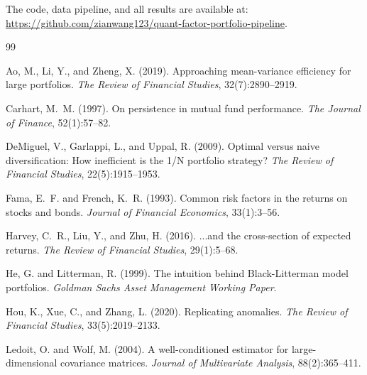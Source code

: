 \documentclass[12pt,a4paper]{article}
\begin{document}
The code, data pipeline, and all results are available at:\\ \url{https://github.com/zianwang123/quant-factor-portfolio-pipeline}.

\begin{thebibliography}{99}

Ao, M., Li, Y., and Zheng, X. (2019).
\newblock Approaching mean-variance efficiency for large portfolios.
\newblock \textit{The Review of Financial Studies}, 32(7):2890--2919.

Carhart, M.~M. (1997).
\newblock On persistence in mutual fund performance.
\newblock \textit{The Journal of Finance}, 52(1):57--82.

DeMiguel, V., Garlappi, L., and Uppal, R. (2009).
\newblock Optimal versus naive diversification: How inefficient is the 1/N portfolio strategy?
\newblock \textit{The Review of Financial Studies}, 22(5):1915--1953.

Fama, E.~F. and French, K.~R. (1993).
\newblock Common risk factors in the returns on stocks and bonds.
\newblock \textit{Journal of Financial Economics}, 33(1):3--56.

Harvey, C.~R., Liu, Y., and Zhu, H. (2016).
\newblock ...and the cross-section of expected returns.
\newblock \textit{The Review of Financial Studies}, 29(1):5--68.

He, G. and Litterman, R. (1999).
\newblock The intuition behind Black-Litterman model portfolios.
\newblock \textit{Goldman Sachs Asset Management Working Paper}.

Hou, K., Xue, C., and Zhang, L. (2020).
\newblock Replicating anomalies.
\newblock \textit{The Review of Financial Studies}, 33(5):2019--2133.

Ledoit, O. and Wolf, M. (2004).
\newblock A well-conditioned estimator for large-dimensional covariance matrices.
\newblock \textit{Journal of Multivariate Analysis}, 88(2):365--411.

\end{thebibliography}
\end{document}
